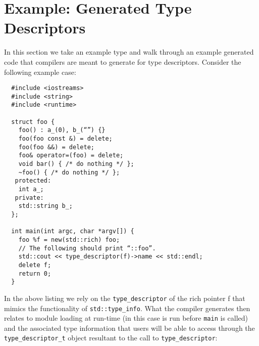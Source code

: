 \documentclass[10pt,a4paper]{article}
\begin{document}
\section{Example: Generated Type Descriptors}
\label{appendix:example-1}

In this section we take an example type and walk through an example generated
code that compilers are meant to generate for type descriptors. Consider the
following example case:

\begin{verbatim}
  #include <iostreams>
  #include <string>
  #include <runtime>

  struct foo {
    foo() : a_(0), b_(“”) {}
    foo(foo const &) = delete;
    foo(foo &&) = delete;
    foo& operator=(foo) = delete;
    void bar() { /* do nothing */ };
    ~foo() { /* do nothing */ };
   protected:
    int a_;
   private:
    std::string b_;
  };

  int main(int argc, char *argv[]) {
    foo %f = new(std::rich) foo;
    // The following should print “::foo”.
    std::cout << type_descriptor(f)->name << std::endl;
    delete f;
    return 0;
  }
\end{verbatim}

In the above listing we rely on the \verb+type_descriptor+ of the rich pointer f
that mimics the functionality of \verb+std::type_info+. What the compiler
generates then relates to module loading at run-time (in this case is run before
\verb+main+ is called) and the associated type information that users will be
able to access through the \verb+type_descriptor_t+ object resultant to the call
to \verb+type_descriptor+:
\end{document}
